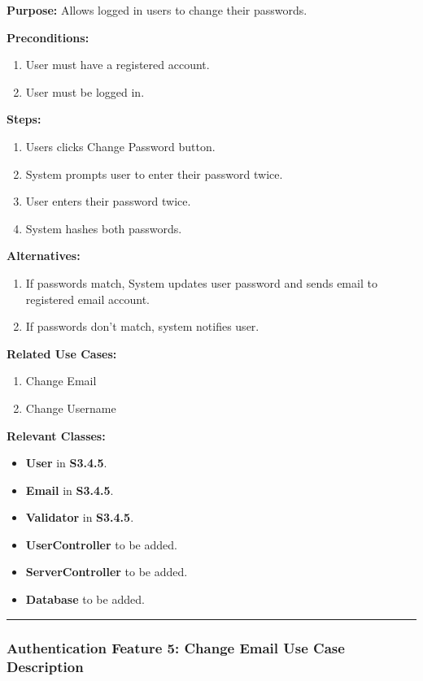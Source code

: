 \documentclass[twoside,letterpaper]{article}
\begin{document}
	\noindent\textbf{Purpose:} Allows logged in users to change their passwords.  \newline
	
	\noindent\textbf{Preconditions:}
	\begin{enumerate}
		\item User must have a registered account.
		\item User must be logged in.
	\end{enumerate}
	
	\noindent\textbf{Steps:}
	\begin{enumerate}
		\item Users clicks Change Password button.
		\item System prompts user to enter their password twice.
		\item User enters their password twice.
		\item System hashes both passwords.
	\end{enumerate}
	
	\noindent\textbf{Alternatives:}
	\begin{enumerate}
		\item If passwords match, System updates user password and sends email to registered email account.
		\item If passwords don't match, system notifies user.
	\end{enumerate}
	
	\noindent\textbf{Related Use Cases:}
	\begin{enumerate}
		\item Change Email
		\item Change Username
	\end{enumerate}
	
	\noindent\textbf{Relevant Classes:}
	\begin{itemize}
		\item \textbf{User} in \textbf{S3.4.5}.
		\item \textbf{Email} in \textbf{S3.4.5}.
		\item \textbf{Validator} in \textbf{S3.4.5}.
		\item \textbf{UserController} to be added.
		\item \textbf{ServerController} to be added.
		\item \textbf{Database} to be added.
	\end{itemize}
	\vspace{8pt}
	\hrule
	\newpage
	
	
	\subsubsection[Authentication Feature 5: Change Email Use Case Description]{\rmfamily\bfseries\color{black}
		Authentication Feature 5: Change Email Use Case Description}
		\label{a:uc5}
	\hypertarget{RefHeading22059017292}{}
	
\end{document}
